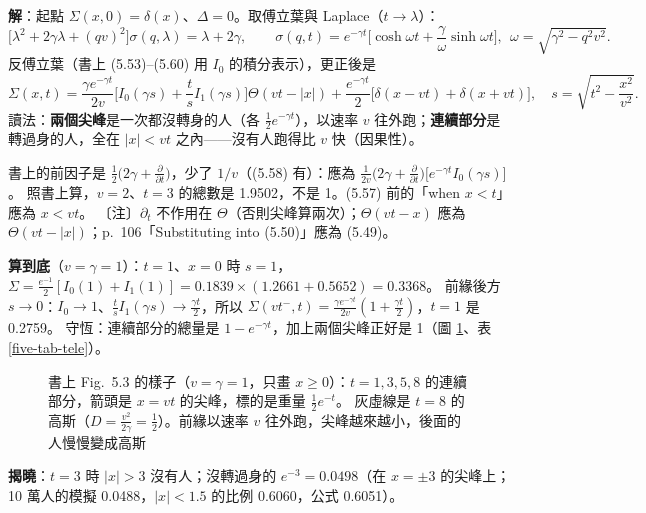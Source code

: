 \textbf{解}：起點 $\Sigma(x,0)=\delta(x)$、$\Delta=0$。取傅立葉與 Laplace（$t\to\lambda$）：
\[\big[\lambda^2+2\gamma\lambda+(qv)^2\big]\sigma(q,\lambda)=\lambda+2\gamma,\qquad
\sigma(q,t)=e^{-\gamma t}\Big[\cosh\omega t+\frac{\gamma}{\omega}\sinh\omega t\Big],\ \ \omega=\sqrt{\gamma^2-q^2v^2}.\tag{5.52}\]
反傅立葉（書上 (5.53)--(5.60) 用 $I_0$ 的積分表示），更正後是
\[\Sigma(x,t)=\frac{\gamma e^{-\gamma t}}{2v}\Big[I_0(\gamma s)+\frac{t}{s}I_1(\gamma s)\Big]\Theta(vt-|x|)+\frac{e^{-\gamma t}}{2}\big[\delta(x-vt)+\delta(x+vt)\big],\quad s=\sqrt{t^2-\frac{x^2}{v^2}}.\tag{5.61}\]
讀法：\textbf{兩個尖峰}是一次都沒轉身的人（各 $\frac12e^{-\gamma t}$），以速率 $v$ 往外跑；\textbf{連續部分}是轉過身的人，全在 $|x|<vt$ 之內——沒有人跑得比 $v$ 快（因果性）。
\begin{errbox}[p.~107，(5.57) 前、(5.60)(5.61)]
書上的前因子是 $\frac12\big(2\gamma+\frac{\partial}{\partial t}\big)$，少了 $1/v$（(5.58) 有）：應為 $\frac{1}{2v}\big(2\gamma+\frac{\partial}{\partial t}\big)\big[e^{-\gamma t}I_0(\gamma s)\big]$。
照書上算，$v=2$、$t=3$ 的總數是 1.9502，不是 1。(5.57) 前的「when $x<t$」應為 $x<vt$。
〔注〕$\partial_t$ 不作用在 $\Theta$（否則尖峰算兩次）；$\Theta(vt-x)$ 應為 $\Theta(vt-|x|)$；p.~106「Substituting into (5.50)」應為 (5.49)。
\end{errbox}

\textbf{算到底}（$v=\gamma=1$）：$t=1$、$x=0$ 時 $s=1$，$\Sigma=\frac{e^{-1}}2[I_0(1)+I_1(1)]=0.1839\times(1.2661+0.5652)=0.3368$。
前緣後方 $s\to0$：$I_0\to1$、$\frac tsI_1(\gamma s)\to\frac{\gamma t}2$，所以 $\Sigma(vt^-,t)=\frac{\gamma e^{-\gamma t}}{2v}(1+\frac{\gamma t}2)$，$t=1$ 是 0.2759。
守恆：連續部分的總量是 $1-e^{-\gamma t}$，加上兩個尖峰正好是 1（圖 \ref{five-fig-tele}、表 \ref{five-tab-tele}）。

\begin{figure}[htbp]
\centering
\FiveFigTele
\caption{書上 Fig.~5.3 的樣子（$v=\gamma=1$，只畫 $x\ge0$）：$t=1,3,5,8$ 的連續部分，箭頭是 $x=vt$ 的尖峰，標的是重量 $\frac12e^{-t}$。
灰虛線是 $t=8$ 的高斯（$D=\frac{v^2}{2\gamma}=\frac12$）。前緣以速率 $v$ 往外跑，尖峰越來越小，後面的人慢慢變成高斯}\label{five-fig-tele}
\end{figure}

\begin{table}[htbp]
\centering
\small
\FiveTabTele
\caption{電報方程的數字。$\Sigma(0,t)$ 從下面趨近高斯；變異數 $\to2Dt-\frac12$}\label{five-tab-tele}
\end{table}

\textbf{揭曉}：$t=3$ 時 $|x|>3$ 沒有人；沒轉過身的 $e^{-3}=0.0498$（在 $x=\pm3$ 的尖峰上；10 萬人的模擬 0.0488，$|x|<1.5$ 的比例 0.6060，公式 0.6051）。

